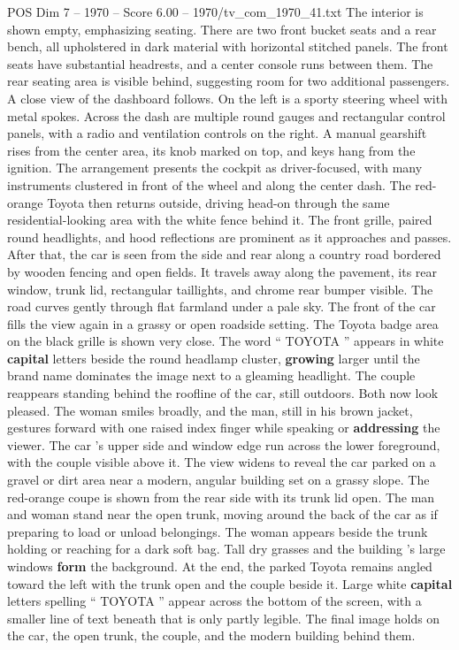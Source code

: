 \begin{textsample}{POS Dim 7 – 1970 – Score 6.00 – 1970/tv\_com\_1970\_41.txt}
The interior is shown empty, emphasizing seating.
There are two front bucket seats and a rear bench, all upholstered in dark material with horizontal stitched panels.
The front seats have substantial headrests, and a center console runs between them.
The rear seating area is visible behind, suggesting room for two additional passengers.
A close view of the dashboard follows.
On the left is a sporty steering wheel with metal spokes.
Across the dash are multiple round gauges and rectangular control panels, with a radio and ventilation controls on the right.
A manual gearshift rises from the center area, its knob marked on top, and keys hang from the ignition.
The arrangement presents the cockpit as driver-focused, with many instruments clustered in front of the wheel and along the center dash.
The red-orange Toyota then returns outside, driving head-on through the same residential-looking area with the white fence behind it.
The front grille, paired round headlights, and hood reflections are prominent as it approaches and passes.
After that, the car is seen from the side and rear along a country road bordered by wooden fencing and open fields.
It travels away along the pavement, its rear window, trunk lid, rectangular taillights, and chrome rear bumper visible.
The road curves gently through flat farmland under a pale sky.
The front of the car fills the view again in a grassy or open roadside setting.
The Toyota badge area on the black grille is shown very close.
The word “ TOYOTA ” appears in white \textbf{capital} letters beside the round headlamp cluster, \textbf{growing} larger until the brand name dominates the image next to a gleaming headlight.
The couple reappears standing behind the roofline of the car, still outdoors.
Both now look pleased.
The woman smiles broadly, and the man, still in his brown jacket, gestures forward with one raised index finger while speaking or \textbf{addressing} the viewer.
The car ’s upper side and window edge run across the lower foreground, with the couple visible above it.
The view widens to reveal the car parked on a gravel or dirt area near a modern, angular building set on a grassy slope.
The red-orange coupe is shown from the rear side with its trunk lid open.
The man and woman stand near the open trunk, moving around the back of the car as if preparing to load or unload belongings.
The woman appears beside the trunk holding or reaching for a dark soft bag.
Tall dry grasses and the building ’s large windows \textbf{form} the background.
At the end, the parked Toyota remains angled toward the left with the trunk open and the couple beside it.
Large white \textbf{capital} letters spelling “ TOYOTA ” appear across the bottom of the screen, with a smaller line of text beneath that is only partly legible.
The final image holds on the car, the open trunk, the couple, and the modern building behind them.

\end{textsample}
